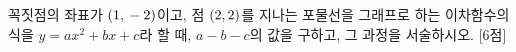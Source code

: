 꼭짓점의 좌표가 $(1{,}\mkern3mu -2)$이고, 점 $(2{,}\mkern3mu 2)$를 지나는 포물선을 그래프로 하는 이차함수의 식을 $y=ax^2+bx+c$라 할 때, $a-b-c$의 값을 구하고, 그 과정을 서술하시오.  \mbox{[6점]}
